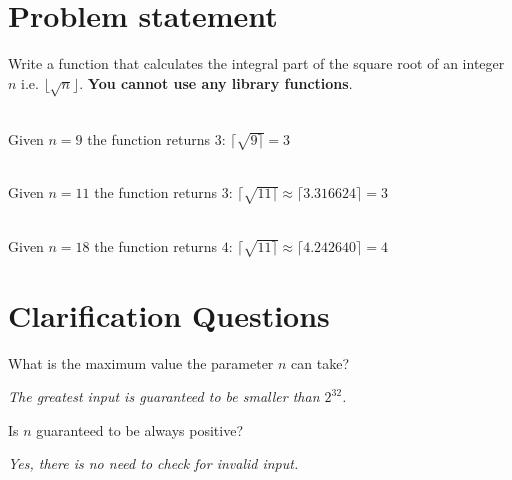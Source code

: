 \section{Problem statement}
	\begin{exercise}
		Write a function that calculates the integral part of the square root of an integer $n$ i.e. $\lfloor \sqrt{n}\rfloor$.
		\textbf{You cannot use any library functions}.


	\begin{example}
	\hfill \\
	Given $n=9$ the function returns $3$: $\lceil\sqrt{9 \rceil}=3$
	\end{example}

	\begin{example}
		\hfill \\
		Given $n=11$ the function returns $3$: $\lceil\sqrt{11 \rceil}\approx\lceil3.316624 \rceil=3$
	\end{example}

	\begin{example}
		\hfill \\
		Given $n=18$ the function returns $4$: $\lceil\sqrt{11 \rceil}\approx\lceil4.242640 \rceil=4$
	\end{example}
	
\end{exercise}

\section{Clarification Questions}
\begin{QandA}
	\begin{questionitem} \begin{question} What is the maximum value the parameter $n$ can take?  \end{question}      
    \begin{answered}
		\textit{The greatest input is guaranteed to be smaller than $2^{32}$.}
	\end{answered} \end{questionitem}
	
	\begin{questionitem} \begin{question} Is $n$ guaranteed to be always positive?  \end{question}      
    \begin{answered}
		\textit{Yes, there is no need to check for invalid input.}
	\end{answered} \end{questionitem}
\end{QandA}

